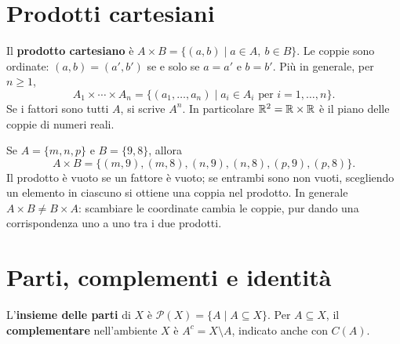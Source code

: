 \begin{schema}
\end{schema}

\section{Prodotti cartesiani}
\begin{definizione}
Il \textbf{prodotto cartesiano} è $A\times B=\{(a,b)\mid a\in A,\ b\in B\}$. Le coppie sono ordinate: $(a,b)=(a',b')$ se e solo se $a=a'$ e $b=b'$. Più in generale, per $n\ge1$,
\[
A_1\times\cdots\times A_n=\{(a_1,\ldots,a_n)\mid a_i\in A_i\text{ per }i=1,\ldots,n\}.
\]
Se i fattori sono tutti $A$, si scrive $A^n$. In particolare $\mathbb{R}^2=\mathbb{R}\times\mathbb{R}$ è il piano delle coppie di numeri reali.
\end{definizione}

\begin{esempio}
Se $A=\{m,n,p\}$ e $B=\{9,8\}$, allora
\[
A\times B=\{(m,9),(m,8),(n,9),(n,8),(p,9),(p,8)\}.
\]
Il prodotto è vuoto se un fattore è vuoto; se entrambi sono non vuoti, scegliendo un elemento in ciascuno si ottiene una coppia nel prodotto. In generale $A\times B\ne B\times A$: scambiare le coordinate cambia le coppie, pur dando una corrispondenza uno a uno tra i due prodotti.
\end{esempio}

\section{Parti, complementi e identità}
\begin{definizione}
L'\textbf{insieme delle parti} di $X$ è $\mathcal P(X)=\{A\mid A\subseteq X\}$. Per $A\subseteq X$, il \textbf{complementare} nell'ambiente $X$ è $A^c=X\setminus A$, indicato anche con $C(A)$.
\end{definizione}

